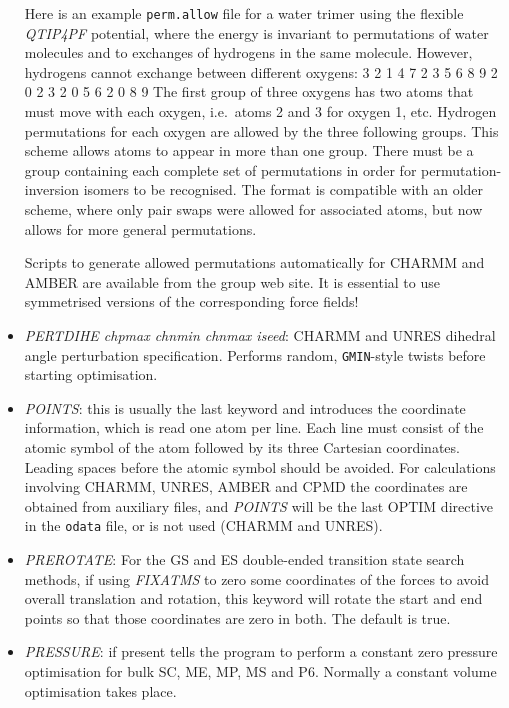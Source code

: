 \documentclass[12pt,a4paper,dvips]{article}
\begin{document}
\begin{itemize}
Here is an example {\tt perm.allow} file for a water trimer using
the flexible {\it QTIP4PF\/} potential, where the energy is invariant to permutations
of water molecules and to exchanges of hydrogens in the same molecule. However,
hydrogens cannot exchange between different oxygens:
{
3 2
1 4 7 2 3 5 6 8 9
2 0 
2 3
2 0 
5 6
2 0 
8 9
}
The first group of three oxygens has two atoms that must move with each oxygen,
i.e.~atoms 2 and 3 for oxygen 1, etc. Hydrogen permutations for each oxygen are
allowed by the three following groups. This scheme allows atoms to appear in more 
than one group. There must be a group containing each complete set of permutations
in order for permutation-inversion isomers to be recognised. The format
is compatible with an older scheme, where only pair swaps were allowed for
associated atoms, but now allows for more general permutations.

Scripts to generate allowed permutations automatically for CHARMM and AMBER are available from
the group web site. It is essential to use symmetrised versions of the corresponding
force fields! 

\item {\it PERTDIHE chpmax chnmin chnmax iseed\/}: CHARMM 
and UNRES dihedral angle perturbation specification.
Performs random, {\tt GMIN}-style twists before starting optimisation.

\item {\it POINTS\/}: this is usually the last keyword and introduces the
coordinate information, which is read one atom per line. Each line must consist
of the atomic symbol of the atom followed by its three Cartesian coordinates.
Leading spaces before the atomic symbol should be avoided. For calculations
involving CHARMM, UNRES, AMBER and CPMD the coordinates are obtained from auxiliary files, 
and {\it POINTS\/} will be the last OPTIM directive in the {\tt odata} file, or
is not used (CHARMM and UNRES).

\item {\it PREROTATE\/}: For the GS and ES double-ended transition state
  search methods, if using {\it FIXATMS\/} to zero some coordinates of the
  forces to avoid overall translation and rotation, this keyword will rotate
  the start and end points so that those coordinates are zero in both.
The default is true.

\item {\it PRESSURE\/}: if present 
tells the program to perform a constant zero pressure optimisation
for bulk SC, ME, MP, MS and P6. Normally a constant volume optimisation takes place. 


\end{itemize}
\end{document}

